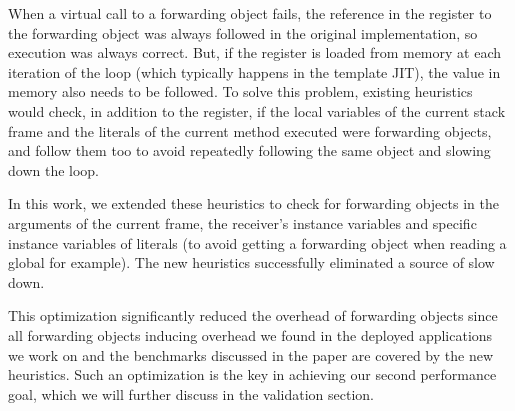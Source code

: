 \documentclass[sigplan,10pt,review,anonymous]{acmart}\settopmatter{printfolios=true,printccs=false,printacmref=false}
\begin{document}
When a virtual call to a forwarding object fails, the reference in the register to the forwarding object was always followed in the original implementation, so execution was always correct. But, if the register is loaded from memory at each iteration of the loop (which typically happens in the template JIT), the value in memory also needs to be followed. %
To solve this problem, existing heuristics would check, in addition to the register, if the local variables of the current stack frame and the literals of the current method executed were forwarding objects, and follow them too to avoid repeatedly following the same object and slowing down the loop.
 
In this work, we extended these heuristics to check for forwarding objects in the arguments of the current frame, the receiver's instance variables and specific instance variables of literals (to avoid getting a forwarding object when reading a global for example). The new heuristics successfully eliminated a source of slow down.

This optimization significantly reduced the overhead of forwarding objects since all forwarding objects inducing overhead we found in the deployed applications we work on and the benchmarks discussed in the paper are covered by the new heuristics.
Such an optimization is the key in achieving our second performance goal, which we will further discuss in the validation section.
\end{document}
